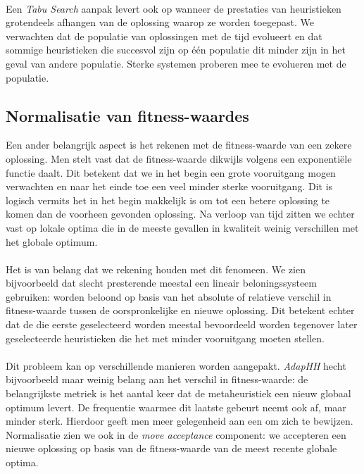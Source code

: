 \paragraph{}
Een \emph{Tabu Search} aanpak levert ook op wanneer de prestaties van heuristieken grotendeels afhangen van de oplossing waarop ze worden toegepast. We verwachten dat de populatie van oplossingen met de tijd evolueert en dat sommige heuristieken die succesvol zijn op \'e\'en populatie dit minder zijn in het geval van andere populatie. Sterke systemen proberen mee te evolueren met de populatie.

\subsection{Normalisatie van fitness-waardes}
Een ander belangrijk aspect is het rekenen met de fitness-waarde van een zekere oplossing. Men stelt vast dat de fitness-waarde dikwijls volgens een exponenti\"ele functie daalt. Dit betekent dat we in het begin een grote vooruitgang mogen verwachten en naar het einde toe een veel minder sterke vooruitgang. Dit is logisch vermits het in het begin makkelijk is om tot een betere oplossing te komen dan de voorheen gevonden oplossing. Na verloop van tijd zitten we echter vast op lokale optima die in de meeste gevallen in kwaliteit weinig verschillen met het globale optimum.

\paragraph{}
Het is van belang dat we rekening houden met dit fenomeen. We zien bijvoorbeeld dat slecht presterende \abhhn{} meestal een lineair beloningssysteem gebruiken: \abhn{} worden beloond op basis van het absolute of relatieve verschil in fitness-waarde tussen de oorspronkelijke en nieuwe oplossing. Dit betekent echter dat de \abhn{} die eerste geselecteerd worden meestal bevoordeeld worden tegenover later geselecteerde heuristieken die het met minder vooruitgang moeten stellen.

\paragraph{}
Dit probleem kan op verschillende manieren worden aangepakt. \emph{AdapHH} hecht bijvoorbeeld maar weinig belang aan het verschil in fitness-waarde: de belangrijkste metriek is het aantal keer dat de metaheuristiek een nieuw globaal optimum levert. De frequentie waarmee dit laatste gebeurt neemt ook af, maar minder sterk. Hierdoor geeft men meer gelegenheid aan een \abh{} om zich te bewijzen. Normalisatie zien we ook in de \emph{move acceptance} component: we accepteren een nieuwe oplossing op basis van de fitness-waarde van de meest recente globale optima. %

